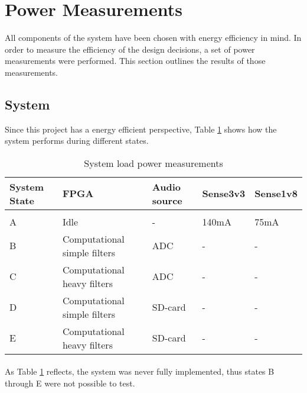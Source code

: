 \section{Power Measurements}\label{power_measurements}

All components of the system have been chosen with energy efficiency in mind. In
order to measure the efficiency of the design decisions, a set of power
measurements were performed. This section outlines the results of those
measurements.

\subsection{System}
Since this project has a energy efficient perspective, Table \ref{tab:results/power-measurement}
shows how the system performs during different states.

\begin{table}[H]
    \begin{tabular}{lllll}
	System State & FPGA                         & Audio source & Sense3v3 & Sense1v8 \\
	\hline \\
	A     & Idle                         & -            & 140mA    & 75mA \\
	B     & Computational simple filters & ADC          & -        & - \\
	C     & Computational heavy filters  & ADC          & -        & - \\
        D     & Computational simple filters & SD-card      & -        & - \\
        E     & Computational heavy filters  & SD-card      & -        & -
    \end{tabular}
    \label{tab:results/power-measurement}
    \caption{System load power measurements}
\end{table}

\paragraph*{}

As Table \ref{tab:results/power-measurement} reflects, the system was never
fully implemented, thus states B through E were not possible to test.
